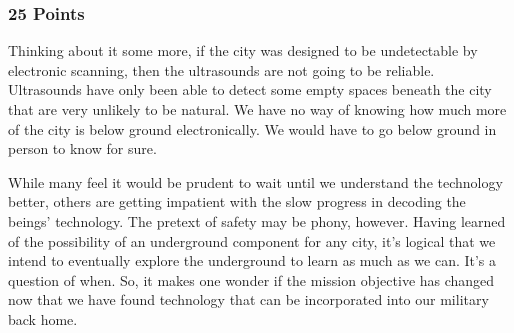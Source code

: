 \documentclass[conference]{IEEEtran}
\begin{document}
\subsubsection*{25 Points}
Thinking about it some more, if the city was designed to be undetectable by electronic scanning, then the ultrasounds are not going to be reliable. Ultrasounds have only been able to detect some empty spaces beneath the city that are very unlikely to be natural.  We have no way of knowing how much more of the city is below ground electronically. We would have to go below ground in person to know for sure. 

While many feel it would be prudent to wait until we understand the technology better, others are getting impatient with the slow progress in decoding the beings’ technology. The pretext of safety may be phony, however.  Having learned of the possibility of an underground component for any city, it’s logical that we intend to eventually explore the underground to learn as much as we can. It’s a question of when. So, it makes one wonder if the mission objective has changed now that we have found technology that can be incorporated into our  military back home. 
\end{document}
